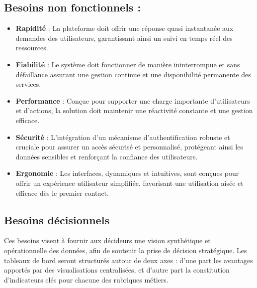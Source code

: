 \documentclass[a4paper,11pt]{report}
\begin{document}
\subsection{Besoins non fonctionnels :}
\begin{itemize}[label = --]
	\item \textbf{Rapidité} : La plateforme doit offrir une réponse quasi instantanée aux demandes des utilisateurs, garantissant ainsi un suivi en temps réel des ressources.
	\item \textbf{Fiabilité} : Le système doit fonctionner de manière ininterrompue et sans défaillance assurant une gestion continue et une disponibilité permanente des services.
	\item \textbf{Performance} : Conçue pour supporter une charge importante d'utilisateurs et d'actions, la solution doit maintenir une réactivité constante et une gestion efficace.
	\item \textbf{Sécurité} : L'intégration d'un mécanisme d'authentification robuste et cruciale pour assurer un accès sécurisé et personnalisé, protégeant ainsi les données sensibles et renforçant la confiance des utilisateurs. 
	\item \textbf{Ergonomie} : Les interfaces, dynamiques et intuitives, sont conçues pour offrir un expérience utilisateur simplifiée, favorisant une utilisation aisée et efficace dès le premier contact.
\end{itemize}
\subsection{Besoins décisionnels}

Ces besoins visent à fournir aux décideurs une vision synthétique et opérationnelle des données, afin de soutenir la prise de décision stratégique. Les tableaux de bord seront structurés autour de deux axes : d’une part les avantages apportés par des visualisations centralisées, et d’autre part la constitution d’indicateurs clés pour chacune des rubriques métiers.

\vspace{1em}

\end{document}
